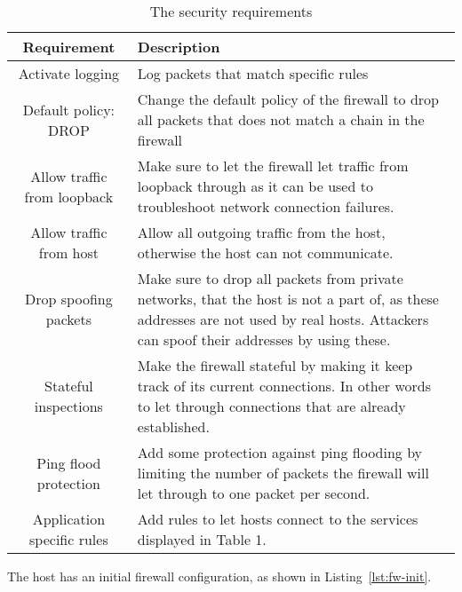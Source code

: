 \begin{table}[h]
\centering
	\begin{tabular}{| c | p{5cm} | }
	\hline
	 Requirement & Description \\ \hline
	 Activate logging & Log packets that match specific rules  \\
	 Default policy: DROP & Change the default policy of the firewall to drop all packets that does not match a chain in the firewall \\
	 Allow traffic from loopback & Make sure to let the firewall let traffic from loopback through as it can be used to troubleshoot network connection failures. \\
	 Allow traffic from host & Allow all outgoing traffic from the host, otherwise the host can not communicate. \\
	 Drop spoofing packets & Make sure to drop all packets from private networks, that the host is not a part of, as these addresses are not used by real hosts. Attackers can spoof their addresses by using these. \\
	 Stateful inspections & Make the firewall stateful by making it keep track of its current connections. In other words to let through connections that are already established. \\
	 Ping flood protection & Add some protection against ping flooding by limiting the number of packets the firewall will let through to one packet per second. \\ 
	 Application specific rules & Add rules to let hosts connect to the services displayed in Table 1. \\
	\hline
	\end{tabular}
	\caption{The security requirements}
	\label{Security requirements table}
\end{table}


The host has an initial firewall configuration, as shown in 
Listing~\ref{lst:fw-init}.




